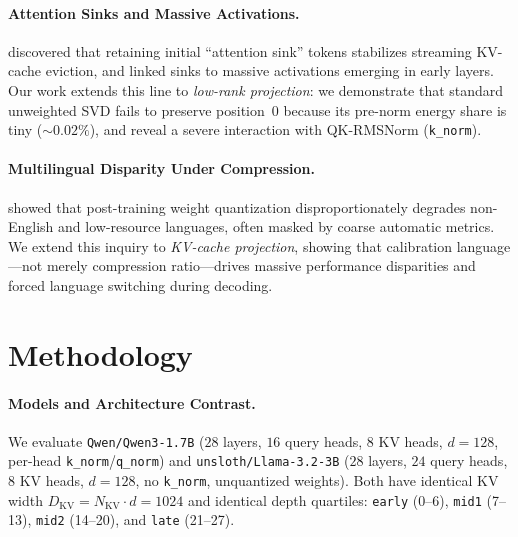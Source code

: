 \documentclass[11pt,a4paper,twocolumn]{article}
\begin{document}
\paragraph{Attention Sinks and Massive Activations.}
\citet{xiao2024streamingllm} discovered that retaining initial ``attention sink'' tokens stabilizes streaming KV-cache eviction, and \citet{sun2024massive} linked sinks to massive activations emerging in early layers. Our work extends this line to \emph{low-rank projection}: we demonstrate that standard unweighted SVD fails to preserve position~0 because its pre-norm energy share is tiny ($\sim 0.02\%$), and reveal a severe interaction with QK-RMSNorm (\texttt{k\_norm}).

\paragraph{Multilingual Disparity Under Compression.}
\citet{marchisio2024quantization} showed that post-training weight quantization disproportionately degrades non-English and low-resource languages, often masked by coarse automatic metrics. We extend this inquiry to \emph{KV-cache projection}, showing that calibration language---not merely compression ratio---drives massive performance disparities and forced language switching during decoding.

\section{Methodology}

\paragraph{Models and Architecture Contrast.}
We evaluate \texttt{Qwen/Qwen3-1.7B} ($28$ layers, $16$ query heads, $8$ KV heads, $d=128$, per-head \texttt{k\_norm}/\texttt{q\_norm}) and \texttt{unsloth/Llama-3.2-3B} ($28$ layers, $24$ query heads, $8$ KV heads, $d=128$, no \texttt{k\_norm}, unquantized weights). Both have identical KV width $D_{\text{KV}}=N_{\text{KV}}\cdot d = 1024$ and identical depth quartiles: \texttt{early} (0--6), \texttt{mid1} (7--13), \texttt{mid2} (14--20), and \texttt{late} (21--27).
\end{document}
